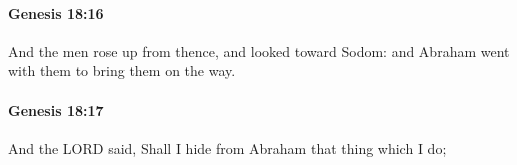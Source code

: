 		\paragraph{Genesis 18:16} %
			\label{GENESIS-18-16}

			And the men rose up from thence, and looked toward Sodom: and Abraham went with them to bring them on the way.


		\paragraph{Genesis 18:17} %
			\label{GENESIS-18-17}

			And the LORD said, Shall I hide from Abraham that thing which I do;


